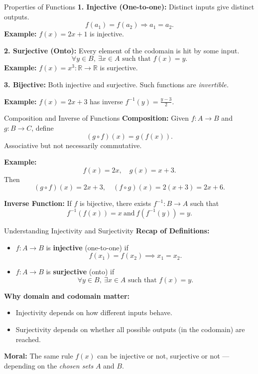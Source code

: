 \documentclass[11pt]{beamer}
\theoremstyle{plain}
\begin{document}
\begin{frame}{Properties of Functions}
\textbf{1. Injective (One-to-one):}  
Distinct inputs give distinct outputs.
\[
f(a_1) = f(a_2) \Rightarrow a_1 = a_2.
\]
\textbf{Example:} $f(x) = 2x + 1$ is injective.

\medskip
\textbf{2. Surjective (Onto):}  
Every element of the codomain is hit by some input.
\[
\forall y \in B, \ \exists x \in A \text{ such that } f(x) = y.
\]
\textbf{Example:} $f(x) = x^3: \mathbb{R} \to \mathbb{R}$ is surjective.

\medskip
\textbf{3. Bijective:} Both injective and surjective.  
Such functions are \emph{invertible.}

\textbf{Example:} $f(x) = 2x + 3$ has inverse $f^{-1}(y) = \frac{y-3}{2}$.
\end{frame}

\begin{frame}{Composition and Inverse of Functions}
\textbf{Composition:}  
Given $f: A \to B$ and $g: B \to C$, define
\[
(g \circ f)(x) = g(f(x)).
\]
Associative but not necessarily commutative.

\textbf{Example:}
\[
f(x) = 2x, \quad g(x) = x + 3.
\]
Then
\[
(g \circ f)(x) = 2x + 3, \quad (f \circ g)(x) = 2(x + 3) = 2x + 6.
\]

\medskip
\textbf{Inverse Function:}  
If $f$ is bijective, there exists $f^{-1}: B \to A$ such that
\[
f^{-1}(f(x)) = x \ \text{and} \ f(f^{-1}(y)) = y.
\]
\end{frame}


\begin{frame}{Understanding Injectivity and Surjectivity}
\textbf{Recap of Definitions:}

\begin{itemize}
    \item $f: A \to B$ is \textbf{injective} (one-to-one) if 
    \[
    f(x_1) = f(x_2) \implies x_1 = x_2.
    \]
    \item $f: A \to B$ is \textbf{surjective} (onto) if 
    \[
    \forall y \in B, \ \exists x \in A \text{ such that } f(x) = y.
    \]
\end{itemize}

\textbf{Why domain and codomain matter:}
\begin{itemize}
    \item Injectivity depends on how different inputs behave.
    \item Surjectivity depends on whether all possible outputs (in the codomain) are reached.
\end{itemize}

\textbf{Moral:}  
The same rule $f(x)$ can be injective or not, surjective or not — depending on the \emph{chosen sets} $A$ and $B$.
\end{frame}
\end{document}
